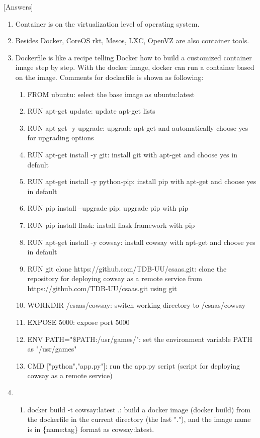 \documentclass[a4paper,11pt]{article}
\begin{document}
[Answers]
\begin{enumerate}
    \item Container is on the virtualization level of operating system. 
    \item Besides Docker, CoreOS rkt, Mesos, LXC, OpenVZ are also container tools. 
    \item Dockerfile is like a recipe telling Docker how to build a customized container image step by step. With the docker image, docker can run a container based on the image. Comments for dockerfile is shown as following: 
    \begin{enumerate}
        \item FROM ubuntu: select the base image as ubuntu:latest
        \item RUN apt-get update: update apt-get lists
        \item RUN apt-get -y upgrade: upgrade apt-get and automatically choose yes for upgrading options
        \item RUN apt-get install -y git: install git with apt-get and choose yes in default
        \item RUN apt-get install -y python-pip: install pip with apt-get and choose yes in default
        \item RUN pip install --upgrade pip: upgrade pip with pip
        \item RUN pip install flask: install flask framework with pip
        \item RUN apt-get install -y cowsay: install cowsay with apt-get and choose yes in default
        \item RUN git clone https://github.com/TDB-UU/csaas.git: clone the repository for deploying cowsay as a remote service from https://github.com/TDB-UU/csaas.git using git
        \item WORKDIR /csaas/cowsay: switch working directory to /csaas/cowsay
        \item EXPOSE 5000: expose port 5000
        \item ENV PATH="\${PATH}:/usr/games/": set the environment variable PATH as "/usr/games"
        \item CMD ["python","app.py"]: run the app.py script (script for deploying cowsay as a remote service)
    \end{enumerate}
    \item \begin{enumerate}
        \item docker build -t cowsay:latest .: build a docker image (docker build) from the dockerfile in the current directory (the last "."), and the image name is in \{name:tag\} format as cowsay:latest. 

\end{enumerate}
\end{enumerate}
\end{document}
